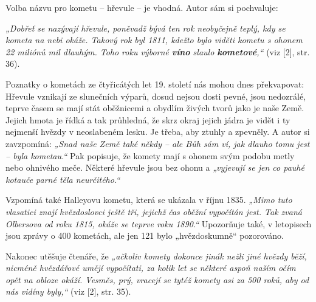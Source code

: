 \documentclass[10pt,a5paper,twoside]{book}
\begin{document}
Volba názvu pro kometu – hřevule – je vhodná. Autor sám si pochvaluje:
\par
\textit{„Dobřeť se nazývají hřevule, poněvadž bývá ten rok neobyčejně teplý, kdy se kometa na nebi okáže. Takový rok byl 1811, kdežto bylo viděti kometu s ohonem 22 miliónů mil dlauhým. Toho roku výborné \textbf{víno} slaulo \textbf{kometové},“}  (viz [2], str. 36).   
\par
Poznatky o kometách ze čtyřicátých let 19. století nás mohou dnes překvapovat: Hřevule vznikají ze slunečních výparů, dosud nejsou dosti pevné, jsou nedozrálé, teprve časem se mají stát oběžnicemi a obydlím živých tvorů jako je naše Země. Jejich hmota je řídká a tak průhledná, že skrz okraj jejich jádra je vidět i ty nejmenší hvězdy v neoslabeném lesku. Je třeba, aby ztuhly a zpevněly. A autor si zavzpomíná: \textit{„Snad naše Země také někdy – ale Bůh sám ví, jak dlauho tomu jest – byla kometau.“}  Pak  popisuje, že komety mají s ohonem svým podobu metly nebo ohnivého meče. Některé hřevule jsou bez ohonu a \textit{„vyjevují se jen co pauhé kotauče parné těla neurčitého.“} 
\par
Vzpomíná také Halleyovu kometu, která se ukázala v říjnu 1835.  \textit{„Mimo tuto vlasatici znají hvězdoslovci ještě tři, jejichž čas oběžní vypočítán jest. Tak zvaná Olbersova od roku 1815, okáže se teprve roku 1890.“} Upozorňuje také, v letopisech jsou zprávy o 400 kometách, ale jen 121 bylo „hvězdoskumně“ pozorováno. 
\par
Nakonec utěšuje čtenáře, že \textit{„ačkoliv komety dokonce jinák nežli jiné hvězdy běží, nicméně hvězdářové umějí vypočítati, za kolik let se některé aspoň naším očím opět na obloze okáží. Vesměs, prý, vracejí se tytéž komety asi za 500 roků, aby od nás vidíny byly,“} (viz [2], str. 35).       
\par 
\end{document}
